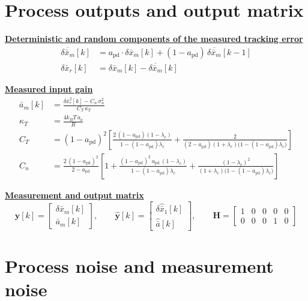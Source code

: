 \documentclass[11pt,a4paper]{ctexart}
\newcommand{\lc}{\lambda_c}
\newcommand{\bx}{\bar{x}}
\newcommand{\ba}{\bar{a}}
\newcommand{\apd}{a_{\mathrm{pd}}}
\newcommand{\hd}[1]{\par\bigskip\noindent\underline{\textbf{#1}}}
\begin{document}
\section{Process outputs and output matrix}

\hd{Deterministic and random components of the measured tracking error}
\[
\begin{aligned}
\overline{\delta\bx_m}[k] &= \apd\cdot\delta\bx_m[k] + (1 - \apd)\,\overline{\delta\bx_m}[k-1] \\
\delta\bx_r[k] &= \delta\bx_m[k] - \overline{\delta\bx_m}[k]
\end{aligned}
\]

\hd{Measured input gain}
\[
\begin{aligned}
\ba_m[k] &= \frac{\delta\bx_r^2[k] - C_n\,\sigma^2_{n}}{C_T\,\kappa_T} \\
\kappa_T &= \frac{4 k_B T\, a_o}{R} \\
C_T &= (1-\apd)^2\left[\frac{2\,(1-\apd)(1-\lc)}{1-(1-\apd)\lc} + \frac{2}{(2-\apd)(1+\lc)\big(1-(1-\apd)\lc\big)}\right] \\
C_n &= \frac{2\,(1-\apd)^2}{2-\apd}\left[1 + \frac{(1-\apd)^2\,\apd\,(1-\lc)}{1-(1-\apd)\lc} + \frac{(1-\lc)^2}{(1+\lc)\big(1-(1-\apd)\lc\big)}\right]
\end{aligned}
\]

\hd{Measurement and output matrix}
\[
\mathbf{y}[k] = \begin{bmatrix} \delta\bx_m[k] \\ \ba_m[k] \end{bmatrix},
\qquad
\hat{\mathbf{y}}[k] = \begin{bmatrix} \delta\hat{\bx}_1[k] \\ \hat{\ba}[k] \end{bmatrix},
\qquad
\mathbf{H} =
\begin{bmatrix}
1 & 0 & 0 & 0 & 0 \\
0 & 0 & 0 & 1 & 0
\end{bmatrix}
\]

\section{Process noise and measurement noise}
\end{document}
